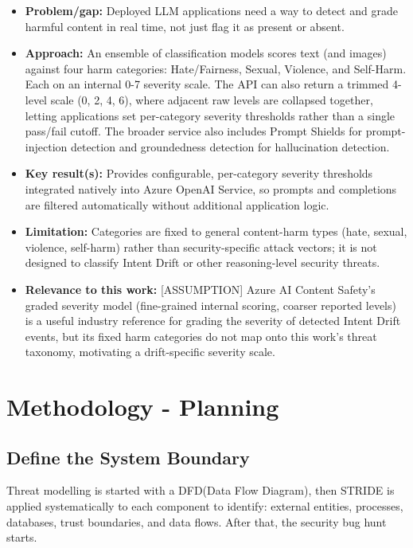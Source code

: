 \documentclass[a4paper,12pt]{report}
\begin{document}
\begin{itemize}
    \item \textbf{Problem/gap:} Deployed LLM applications need a way to detect and grade 
    harmful content in real time, not just flag it as present or absent.
    \item \textbf{Approach:} An ensemble of classification models scores text (and images) 
    against four harm categories: Hate/Fairness, Sexual, Violence, and Self-Harm. Each 
    on an internal 0-7 severity scale. The API can also return a trimmed 4-level scale 
    (0, 2, 4, 6), where adjacent raw levels are collapsed together, letting applications 
    set per-category severity thresholds rather than a single pass/fail cutoff. The 
    broader service also includes Prompt Shields for prompt-injection detection and 
    groundedness detection for hallucination detection.
    \item \textbf{Key result(s):} Provides configurable, per-category severity thresholds 
    integrated natively into Azure OpenAI Service, so prompts and completions are filtered 
    automatically without additional application logic.
    \item \textbf{Limitation:} Categories are fixed to general content-harm types 
    (hate, sexual, violence, self-harm) rather than security-specific attack vectors; 
    it is not designed to classify Intent Drift or other reasoning-level security threats.
    \item \textbf{Relevance to this work:} [ASSUMPTION]
    Azure AI Content Safety's graded severity model (fine-grained internal scoring, 
    coarser reported levels) is a useful industry reference for grading the severity 
    of detected Intent Drift events, but its fixed harm categories do not map onto this 
    work's threat taxonomy, motivating a drift-specific severity scale.
\end{itemize}

\chapter{Methodology - Planning}
\section{Define the System Boundary}
Threat modelling is started with a DFD(Data Flow Diagram), then STRIDE is applied systematically to each component to identify: external entities, processes, 
databases, trust boundaries, and data flows. After that, the security bug hunt starts.
\end{document}
